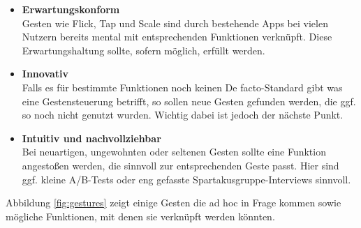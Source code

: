\documentclass[a4paper,12pt]{article}
\begin{document}
\begin{itemize}
	\item \textbf{Erwartungskonform} \\
		Gesten wie Flick, Tap und Scale sind durch bestehende Apps bei vielen Nutzern bereits mental mit entsprechenden Funktionen verknüpft. Diese Erwartungshaltung sollte, sofern möglich, erfüllt werden.
	\item \textbf{Innovativ} \\
		Falls es für bestimmte Funktionen noch keinen De facto-Standard gibt was eine Gestensteuerung betrifft, so sollen neue Gesten gefunden werden, die ggf. so noch nicht genutzt wurden. Wichtig dabei ist jedoch der nächste Punkt.
	\item \textbf{Intuitiv und nachvollziehbar} \\
		Bei neuartigen, ungewohnten oder seltenen Gesten sollte eine Funktion angestoßen werden, die sinnvoll zur entsprechenden Geste passt. Hier sind ggf. kleine A/B-Tests oder eng gefasste Spartakusgruppe-Interviews sinnvoll.
\end{itemize}

Abbildung \ref{fig:gestures} zeigt einige Gesten die ad hoc in Frage kommen sowie mögliche Funktionen, mit denen sie verknüpft werden könnten.
\end{document}
